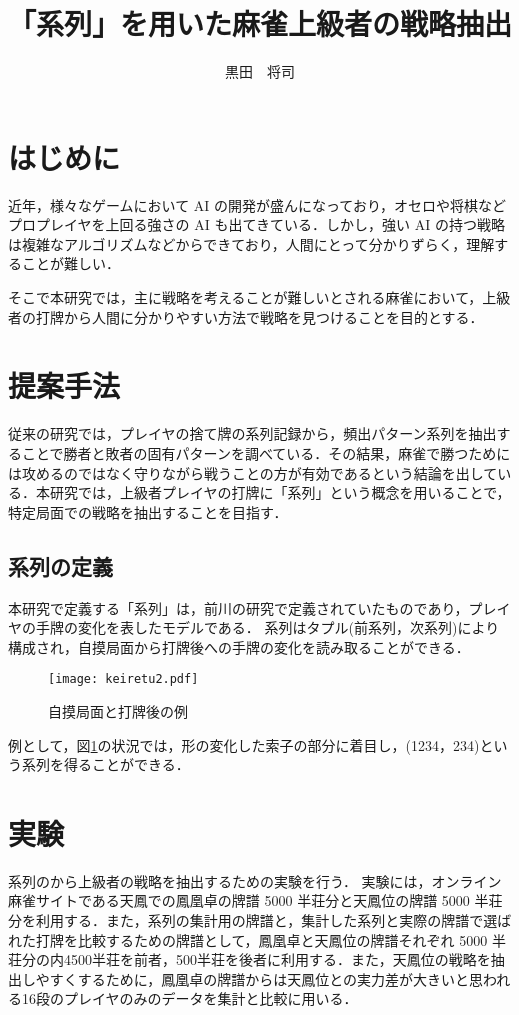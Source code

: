 \documentclass[a4j]{jarticle}
\title{「系列」を用いた麻雀上級者の戦略抽出}
\author{黒田~~将司}
\begin{document}
\begin{Abstract}

 \section{はじめに}
 近年，様々なゲームにおいて AI の開発が盛んになっており，オセロや将棋などプロプレイヤを上回る強さの AI も出てきている．しかし，強い AI の持つ戦略は複雑なアルゴリズムなどからできており，人間にとって分かりずらく，理解することが難しい．
 
 そこで本研究では，主に戦略を考えることが難しいとされる麻雀において，上級者の打牌から人間に分かりやすい方法で戦略を見つけることを目的とする．

 \section{提案手法}
 従来の研究では，プレイヤの捨て牌の系列記録から，頻出パターン系列を抽出することで勝者と敗者の固有パターンを調べている\cite{sakaida}．その結果，麻雀で勝つためには攻めるのではなく守りながら戦うことの方が有効であるという結論を出している．本研究では，上級者プレイヤの打牌に「系列」という概念を用いることで，特定局面での戦略を抽出することを目指す．
 
 \subsection{系列の定義}
 本研究で定義する「系列」は，前川の研究\cite{maekawa}で定義されていたものであり，プレイヤの手牌の変化を表したモデルである．
 系列はタプル(前系列，次系列)により構成され，自摸局面から打牌後への手牌の変化を読み取ることができる．
 \begin{figure}[h]
  \setlength\abovecaptionskip{-1mm}
  \centering
    \texttt{[image: keiretu2.pdf]}
    \caption{自摸局面と打牌後の例}
    \label{keiretu_fig}
    \vspace{-1zh}
\end{figure}

 例として，図\ref{keiretu_fig}の状況では，形の変化した索子の部分に着目し，(1234，234)という系列を得ることができる．

\section{実験}
 系列のから上級者の戦略を抽出するための実験を行う．
 実験には，オンライン麻雀サイトである天鳳での鳳凰卓の牌譜 5000 半荘分と天鳳位の牌譜 5000 半荘分を利用する．また，系列の集計用の牌譜と，集計した系列と実際の牌譜で選ばれた打牌を比較するための牌譜として，鳳凰卓と天鳳位の牌譜それぞれ 5000 半荘分の内4500半荘を前者，500半荘を後者に利用する．また，天鳳位の戦略を抽出しやすくするために，鳳凰卓の牌譜からは天鳳位との実力差が大きいと思われる16段のプレイヤのみのデータを集計と比較に用いる．
 

\end{Abstract}
\end{document}

